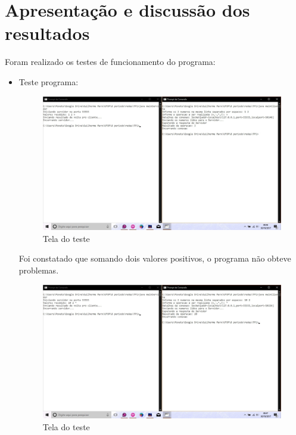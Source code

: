 \documentclass[brazil, a4paper,12pt]{article}
\begin{document}
\newpage
\section{Apresentação e discussão dos resultados}
Foram realizado os testes de funcionamento do programa:

\begin{itemize}
	\item Teste programa: 
	
	\begin{figure}[ht!]
		\centering
		\includegraphics[scale=0.45]{teste1.jpg}
		\caption{Tela do teste}
		\label{Rotulo}
	\end{figure}
	
	Foi constatado que somando dois valores positivos, o programa não obteve problemas.
	
	\newpage

	\begin{figure}[ht!]
		\centering
		\includegraphics[scale=0.45]{teste2.jpg}
		\caption{Tela do teste}
		\label{Rotulo}
	\end{figure}
	

\end{itemize}
\end{document}
